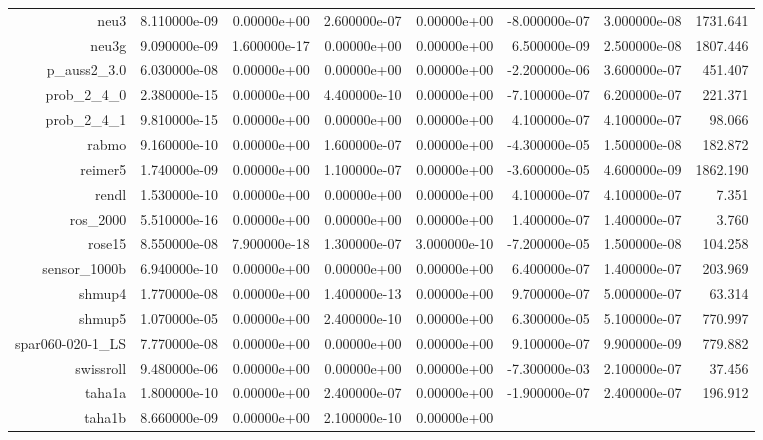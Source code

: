 \documentclass[10pt]{article}
\begin{document}
{{{\begin{table}[h]
\begin{center}
{\begin{tabular}{r|r|r|r|r|r|r|r}
      neu3 & 8.110000e-09 & 0.00000e+00 & 2.600000e-07 & 0.00000e+00 &
      -8.000000e-07 & 3.000000e-08 & 1731.641\\
      neu3g & 9.090000e-09 & 1.600000e-17 & 0.00000e+00 & 0.00000e+00 &
      6.500000e-09 & 2.500000e-08 & 1807.446\\
	  p\_auss2\_3.0 & 6.030000e-08 & 0.00000e+00 & 0.00000e+00 & 0.00000e+00 &
      -2.200000e-06 & 3.600000e-07 & 451.407\\
      prob\_2\_4\_0 & 2.380000e-15 & 0.00000e+00 & 4.400000e-10 & 0.00000e+00
      & -7.100000e-07 & 6.200000e-07 & 221.371\\
      prob\_2\_4\_1 & 9.810000e-15 & 0.00000e+00 & 0.00000e+00 & 0.00000e+00 &
      4.100000e-07 & 4.100000e-07 & 98.066\\
      rabmo & 9.160000e-10 & 0.00000e+00 & 1.600000e-07 & 0.00000e+00 &
      -4.300000e-05 & 1.500000e-08 & 182.872\\
      reimer5 & 1.740000e-09 & 0.00000e+00 & 1.100000e-07 & 0.00000e+00 &
      -3.600000e-05 & 4.600000e-09 & 1862.190\\
      rendl & 1.530000e-10 & 0.00000e+00 & 0.00000e+00 & 0.00000e+00 &
      4.100000e-07 & 4.100000e-07 & 7.351\\
      ros\_2000 & 5.510000e-16 & 0.00000e+00 & 0.00000e+00 & 0.00000e+00 &
      1.400000e-07 & 1.400000e-07 & 3.760\\
      rose15 & 8.550000e-08 & 7.900000e-18 & 1.300000e-07 & 3.000000e-10 &
      -7.200000e-05 & 1.500000e-08 & 104.258\\
      sensor\_1000b & 6.940000e-10 & 0.00000e+00 & 0.00000e+00 & 0.00000e+00 &
      6.400000e-07 & 1.400000e-07 & 203.969\\
      shmup4 & 1.770000e-08 & 0.00000e+00 & 1.400000e-13 & 0.00000e+00 &
      9.700000e-07 & 5.000000e-07 & 63.314\\
      shmup5 & 1.070000e-05 & 0.00000e+00 & 2.400000e-10 & 0.00000e+00 &
      6.300000e-05 & 5.100000e-07 & 770.997\\
      spar060-020-1\_LS & 7.770000e-08 & 0.00000e+00 & 0.00000e+00 &
      0.00000e+00 & 9.100000e-07 & 9.900000e-09 & 779.882\\
      swissroll & 9.480000e-06 & 0.00000e+00 & 0.00000e+00 & 0.00000e+00 &
      -7.300000e-03 & 2.100000e-07 & 37.456\\
      taha1a & 1.800000e-10 & 0.00000e+00 & 2.400000e-07 & 0.00000e+00 &
      -1.900000e-07 & 2.400000e-07 & 196.912\\
      taha1b & 8.660000e-09 & 0.00000e+00 & 2.100000e-10 & 0.00000e+00 &

\end{tabular}}
\end{center}
\end{table}}}}
\end{document}
